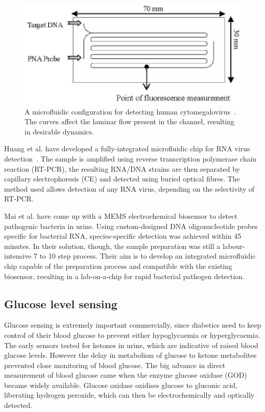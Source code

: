 \documentclass[12pt]{article}
\begin{document}
\begin{figure}
 \includegraphics{cmv.eps}
 \caption{A microfluidic configuration for detecting human cytomegalovirus~\cite{BRIONES_2006}. The curves affect the 
laminar flow present in the channel, resulting in desirable dynamics.}
 \label{fig:cmv}
\end{figure}

Huang et al. have developed a fully-integrated microfluidic chip for RNA virus detection~\cite{HUANG_2005}. The sample is 
amplified using reverse transcription polymerase chain reaction (RT-PCR), the resulting RNA/DNA strains
are then separated by capillary electrophoresis (CE) and detected using buried optical fibres. The
method used allows detection of any RNA virus, depending on the selectivity of RT-PCR.

Mai et al. have come up with a MEMS electrochemical biosensor to detect pathogenic bacteria in urine. Using custom-designed
DNA oligonucleotide probes specific for bacterial RNA, species-specific detection was achieved within
45 minutes. In their solution, though, the sample preparation was still a labour-intensive 7 to 10
step process. Their aim is to develop an integrated microfluidic chip capable of the preparation 
process and compatible with the existing biosensor, resulting in a lab-on-a-chip for rapid
bacterial pathogen detection.~\cite{MAI_2007}

\subsection{Glucose level sensing}

Glucose sensing is extremely important commercially,
since diabetics need to keep control of their blood glucose to
prevent either hypoglycaemia or hyperglycaemia. The early
sensors tested for ketones in urine, which are indicative of
raised blood glucose levels. However the delay in
metabolism of glucose to ketone metabolites prevented close
monitoring of blood glucose. The big advance in direct
measurement of blood glucose came when the enzyme glucose
oxidase (GOD) became widely available. Glucose
oxidase oxidises glucose to gluconic acid, liberating hydrogen
peroxide, which can then be electrochemically and optically
detected.~\cite{YU_2008}
\end{document}
